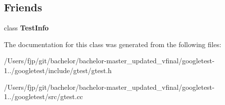 \subsection*{Friends}
\begin{DoxyCompactItemize}
\item 
\mbox{\label{classtesting_1_1_test_a4c49c2cdb6c328e6b709b4542f23de3c}} 
class {\bfseries Test\+Info}
\end{DoxyCompactItemize}


The documentation for this class was generated from the following files\+:\begin{DoxyCompactItemize}
\item 
/\+Users/fjp/git/bachelor/bachelor-\/master\+\_\+updated\+\_\+vfinal/googletest-\/1../googletest/include/gtest/gtest.\+h\item 
/\+Users/fjp/git/bachelor/bachelor-\/master\+\_\+updated\+\_\+vfinal/googletest-\/1../googletest/src/gtest.\+cc\end{DoxyCompactItemize}
